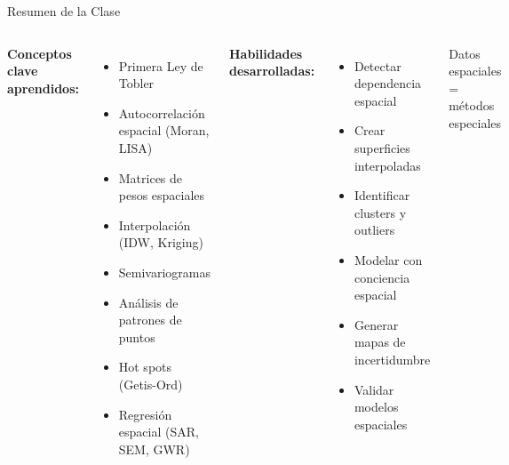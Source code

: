 \documentclass[10pt,aspectratio=169]{beamer}
\newcommand{\conceptbox}[2]{
\begin{tcolorbox}[colframe=usachblue,colback=blue!5,title=#1,fonttitle=\bfseries]
#2
\end{tcolorbox}
}
\begin{document}
\begin{frame}{Resumen de la Clase}
    \begin{columns}[T]
        \textbf{Conceptos clave aprendidos:}
        \begin{itemize}
            \item[\faCheckCircle] Primera Ley de Tobler
            \item[\faCheckCircle] Autocorrelación espacial (Moran, LISA)
            \item[\faCheckCircle] Matrices de pesos espaciales
            \item[\faCheckCircle] Interpolación (IDW, Kriging)
            \item[\faCheckCircle] Semivariogramas
            \item[\faCheckCircle] Análisis de patrones de puntos
            \item[\faCheckCircle] Hot spots (Getis-Ord)
            \item[\faCheckCircle] Regresión espacial (SAR, SEM, GWR)
        \end{itemize}
        
        \textbf{Habilidades desarrolladas:}
        \begin{itemize}
            \item Detectar dependencia espacial
            \item Crear superficies interpoladas
            \item Identificar clusters y outliers
            \item Modelar con conciencia espacial
            \item Generar mapas de incertidumbre
            \item Validar modelos espaciales
        \end{itemize}
        
        \vspace{0.3cm}
        \conceptbox{Mensaje clave}{
            Datos espaciales = métodos especiales
        }
    \end{columns}
\end{frame}
\end{document}
